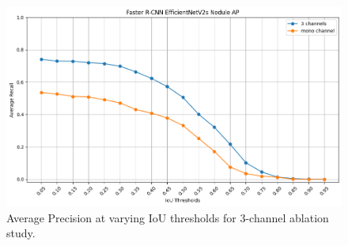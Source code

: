 \begin{figure}[h]
    \centering
    \includegraphics[width=.8\linewidth]{images/3-channel-ablation.png}
    \caption{Average Precision at varying IoU thresholds for 3-channel ablation study.}
    \label{fig:3channel-ablation}
\end{figure}
